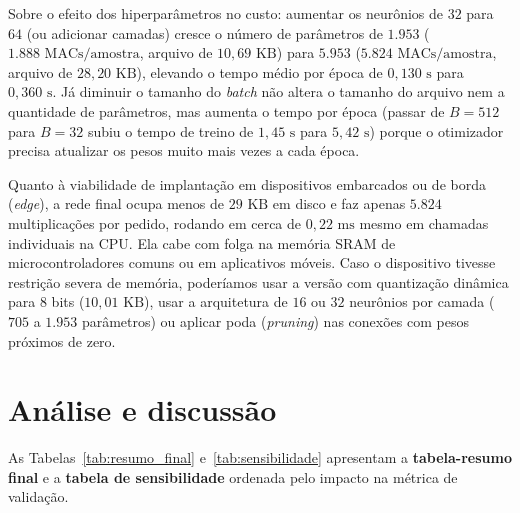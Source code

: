 \documentclass[12pt,a4paper]{article}
\begin{document}
Sobre o efeito dos hiperparâmetros no custo: aumentar os neurônios de $32$ para $64$ (ou adicionar camadas) cresce o número de parâmetros de $1.953$ ($1.888\text{ MACs/amostra}$, arquivo de $10{,}69\text{ KB}$) para $5.953$ ($5.824\text{ MACs/amostra}$, arquivo de $28{,}20\text{ KB}$), elevando o tempo médio por época de $0{,}130\text{ s}$ para $0{,}360\text{ s}$. Já diminuir o tamanho do \textit{batch} não altera o tamanho do arquivo nem a quantidade de parâmetros, mas aumenta o tempo por época (passar de $B = 512$ para $B = 32$ subiu o tempo de treino de $1{,}45\text{ s}$ para $5{,}42\text{ s}$) porque o otimizador precisa atualizar os pesos muito mais vezes a cada época.

Quanto à viabilidade de implantação em dispositivos embarcados ou de borda (\textit{edge}), a rede final ocupa menos de $29\text{ KB}$ em disco e faz apenas $5.824$ multiplicações por pedido, rodando em cerca de $0{,}22\text{ ms}$ mesmo em chamadas individuais na CPU. Ela cabe com folga na memória SRAM de microcontroladores comuns ou em aplicativos móveis. Caso o dispositivo tivesse restrição severa de memória, poderíamos usar a versão com quantização dinâmica para $8$ bits ($10{,}01\text{ KB}$), usar a arquitetura de $16$ ou $32$ neurônios por camada ($705$ a $1.953$ parâmetros) ou aplicar poda (\textit{pruning}) nas conexões com pesos próximos de zero.

\section{Análise e discussão}

As Tabelas~\ref{tab:resumo_final} e~\ref{tab:sensibilidade} apresentam a \textbf{tabela-resumo final} e a \textbf{tabela de sensibilidade} ordenada pelo impacto na métrica de validação.
\end{document}
